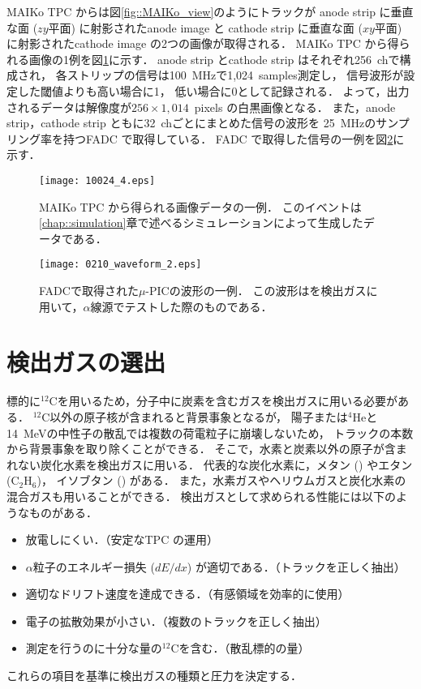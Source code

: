\documentclass[../master]{subfiles}
\begin{document}
MAIKo TPC からは図\ref{fig::MAIKo_view}のようにトラックが
anode strip に垂直な面 ($zy$平面) に射影されたanode image と
cathode strip に垂直な面 ($xy$平面) に射影されたcathode image の2つの画像が取得される．
MAIKo TPC から得られる画像の1例を図\ref{fig::track_demo}に示す．
anode strip とcathode strip はそれぞれ256~chで構成され，
各ストリップの信号は\SI{100}{\mega\hertz}で1,024~samples測定し，
信号波形が設定した閾値よりも高い場合に1，
低い場合に0として記録される．
よって，出力されるデータは解像度が$256\times1,014$~pixels の白黒画像となる．
また，anode strip，cathode strip ともに32~chごとにまとめた信号の波形を
\SI{25}{\mega\hertz}のサンプリング率を持つFADC で取得している．
FADC で取得した信号の一例を図\ref{fig::FADC_waveform}に示す．
\begin{figure}
  \centering
  \texttt{[image: 10024\_4.eps]}
  \caption[MAIKo TPC から得られる画像データの一例．]
          {MAIKo TPC から得られる画像データの一例．
          このイベントは\ref{chap::simulation}章で述べるシミュレーションによって生成したデータである．}
  \label{fig::track_demo}
\end{figure}
\begin{figure}
  \centering
  \texttt{[image: 0210\_waveform\_2.eps]}
  \caption[FADCで取得された$\mu$-PICの波形の一例．]
          {FADCで取得された$\mu$-PICの波形の一例．
          この波形は\isoButaneHydro を検出ガスに用いて，$\alpha$線源でテストした際のものである．}
  \label{fig::FADC_waveform}
\end{figure}

\section{検出ガスの選出}
\label{sec::detection_gas_candidate}
標的に${}^{12}\mathrm{C}$を用いるため，分子中に炭素を含むガスを検出ガスに用いる必要がある．
${}^{12}\mathrm{C}$以外の原子核が含まれると背景事象となるが，
陽子または${}^{4}\mathrm{He}$と\SI{14}{\mega\electronvolt}の中性子の散乱では複数の荷電粒子に崩壊しないため，
トラックの本数から背景事象を取り除くことができる．
そこで，水素と炭素以外の原子が含まれない炭化水素を検出ガスに用いる．
代表的な炭化水素に，メタン (\Methane) やエタン ($\mathrm{C_{2}H_{6}}$)，
イソブタン (\isoButane) がある．
また，水素ガスやヘリウムガスと炭化水素の混合ガスも用いることができる．
検出ガスとして求められる性能には以下のようなものがある．
\begin{itemize}
\item
  放電しにくい．（安定なTPC の運用）
\item
  $\alpha$粒子のエネルギー損失 ($dE/dx$) が適切である．（トラックを正しく抽出）
\item
  適切なドリフト速度を達成できる．（有感領域を効率的に使用）
\item
  電子の拡散効果が小さい．（複数のトラックを正しく抽出）
\item
  測定を行うのに十分な量の${}^{12}\mathrm{C}$を含む．（散乱標的の量）
\end{itemize}
これらの項目を基準に検出ガスの種類と圧力を決定する．
\end{document}
